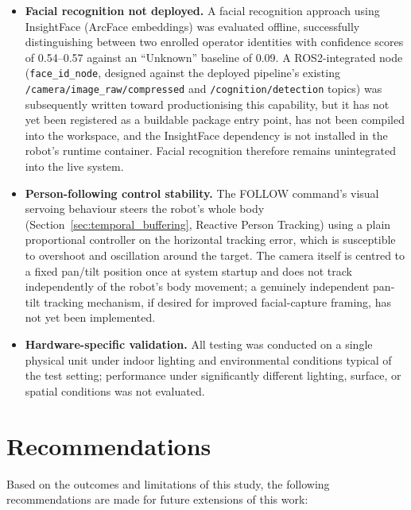 \begin{itemize}
  \item \textbf{Facial recognition not deployed.} A facial recognition approach using
InsightFace (ArcFace embeddings) was evaluated offline, successfully distinguishing
between two enrolled operator identities with confidence scores of 0.54--0.57 against
an ``Unknown'' baseline of 0.09. A ROS2-integrated node
(\texttt{face\_id\_node}, designed against the deployed pipeline's existing
\texttt{/camera/image\_raw/compressed} and \texttt{/cognition/detection} topics) was
subsequently written toward productionising this capability, but it has not yet been
registered as a buildable package entry point, has not been compiled into the
workspace, and the InsightFace dependency is not installed in the robot's runtime
container. Facial recognition therefore remains unintegrated into the live system.

  \item \textbf{Person-following control stability.} The FOLLOW command's visual
servoing behaviour steers the robot's whole body (Section~\ref{sec:temporal_buffering},
Reactive Person Tracking) using a plain proportional controller on the horizontal
tracking error, which is susceptible to overshoot and oscillation around the target.
The camera itself is centred to a fixed pan/tilt position once at system startup and
does not track independently of the robot's body movement; a genuinely independent
pan-tilt tracking mechanism, if desired for improved facial-capture framing, has not
yet been implemented.

  \item \textbf{Hardware-specific validation.} All testing was conducted on a single
  physical unit under indoor lighting and environmental conditions typical of the test
  setting; performance under significantly different lighting, surface, or spatial
  conditions was not evaluated.
\end{itemize}

\section{Recommendations}

Based on the outcomes and limitations of this study, the following recommendations are
made for future extensions of this work:

